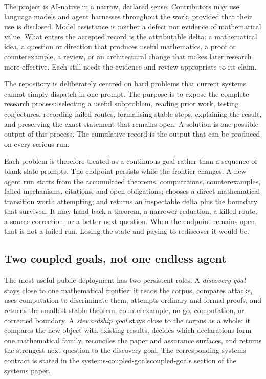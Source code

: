 \documentclass[10pt]{article}
\begin{document}
The project is AI-native in a narrow, declared sense.  Contributors may use
language models and agent harnesses throughout the work, provided that their
use is disclosed.  Model assistance is neither a defect nor evidence of
mathematical value.  What enters the accepted record is the attributable
delta: a mathematical idea, a question or direction that produces useful
mathematics, a proof or counterexample, a review, or an architectural change
that makes later research more effective.  Each still needs the evidence and
review appropriate to its claim.

The repository is deliberately centred on hard problems that current systems
cannot simply dispatch in one prompt.  The purpose is to expose the complete
research process: selecting a useful subproblem, reading prior work, testing
conjectures, recording failed routes, formalising stable steps, explaining the
result, and preserving the exact statement that remains open.  A solution is
one possible output of this process.  The cumulative record is the output that
can be produced on every serious run.

Each problem is therefore treated as a continuous goal rather than a sequence
of blank-slate prompts.  The endpoint persists while the frontier changes.  A
new agent run starts from the accumulated theorems, computations,
counterexamples, failed mechanisms, citations, and open obligations; chooses a
direct mathematical transition worth attempting; and returns an inspectable
delta plus the boundary that survived.  It may hand back a theorem, a narrower
reduction, a killed route, a source correction, or a better next question.
When the endpoint remains open, that is not a failed run.  Losing the state and
paying to rediscover it would be.

\subsection*{Two coupled goals, not one endless agent}

The most useful public deployment has two persistent roles.  A
\emph{discovery goal} stays close to one mathematical frontier: it reads the
corpus, compares attacks, uses computation to discriminate them, attempts
ordinary and formal proofs, and returns the smallest stable theorem,
counterexample, no-go, computation, or corrected boundary.  A
\emph{stewardship goal} stays close to the corpus as a whole: it compares the
new object with existing results, decides which declarations form one
mathematical family, reconciles the paper and assurance surfaces, and returns
the strongest next question to the discovery goal.  The corresponding systems
contract is stated in the %
{systems-coupled-goals}{coupled-goals section of the systems paper}.
\end{document}
